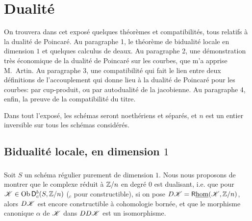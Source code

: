 
\chapter{Dualité}\label{V}




















On trouvera dans cet expos\'e quelques th\'eor\`emes et compatibilit\'es, tous 
relatifs \`a la dualit\'e de Poincar\'e. Au paragraphe 1, le th\'eor\`eme de 
bidualit\'e locale en dimension $1$ \cite[I.5.1]{sga5} et quelques calculus de 
deaux. Au paragraphe 2, une d\'emonstration tr\`es \'economique de la dualit\'e 
de Poincar\'e sur les courbes, que m'a apprise M.\ Artin. Au paragraphe 3, une 
compatibilit\'e qui fait le lien entre deux d\'efinitions de l'accouplement qui 
donne lieu \`a la dualit\'e de Poincar\'e pour les courbes: par cup-produit, ou 
par autodualit\'e de la jacobienne. Au paragraphe 4, enfin, la preuve de la 
compatibilit\'e du titre. 

Dans tout l'expos\'e, les sch\'emas seront noeth\'eriens et s\'epar\'es, et $n$ 
est un entier inversible sur tous les sch\'emas consid\'er\'es. 










\section{Bidualit\'e locale, en dimension \texorpdfstring{$1$}{1}}\label{V:1}





\subsection{}\label{V:1-1}

Soit $S$ un sch\'ema r\'egulier purement de dimension $1$. Nous nous proposons 
de montrer que le complexe r\'eduit \`a $\mathbb{Z}/n$ en degr\'e $0$ est 
dualisant, i.e. que pour $\mathscr{K}\in \operatorname{Ob}\mathsf{D}_c^b(S,\mathbb{Z}/n)$ ($_c$ pour constructible), 
si on pose $D\mathscr{K}=\mathsf{R}\underline\hom(\mathscr{K},\mathbb{Z}/n)$, alors $D\mathscr{K}$ est encore 
constructible \`a cohomologie born\'ee, et que le morphisme canonique $\alpha$ 
de $\mathscr{K}$ dans $D D\mathscr{K}$ est un isomorphisme. 

